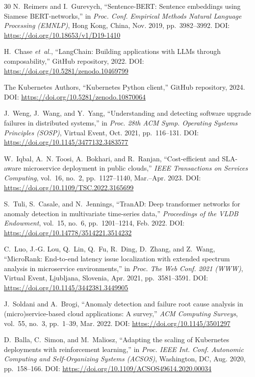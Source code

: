 \documentclass[journal,10pt,twoside]{IEEEtran}
\begin{document}
\begin{thebibliography}{30}
N.~Reimers and I.~Gurevych,
``Sentence-BERT: Sentence embeddings using Siamese BERT-networks,''
in \textit{Proc. Conf. Empirical Methods Natural Language Processing
(EMNLP)}, Hong Kong, China, Nov. 2019, pp.~3982--3992.
\newblock DOI: \url{https://doi.org/10.18653/v1/D19-1410}

H.~Chase \textit{et~al.},
``LangChain: Building applications with LLMs through composability,''
GitHub repository, 2022.
\newblock DOI: \url{https://doi.org/10.5281/zenodo.10469799}

The Kubernetes Authors,
``Kubernetes Python client,''
GitHub repository, 2024.
\newblock DOI: \url{https://doi.org/10.5281/zenodo.10870064}

J.~Weng, J.~Wang, and Y.~Yang,
``Understanding and detecting software upgrade failures in distributed systems,''
in \textit{Proc. 28th ACM Symp. Operating Systems Principles (SOSP)},
Virtual Event, Oct. 2021, pp.~116--131.
\newblock DOI: \url{https://doi.org/10.1145/3477132.3483577}

W.~Iqbal, A.~N. Toosi, A.~Bokhari, and R.~Ranjan,
``Cost-efficient and SLA-aware microservice deployment in public clouds,''
\textit{IEEE Transactions on Services Computing}, vol.~16, no.~2,
pp.~1127--1140, Mar.--Apr. 2023.
\newblock DOI: \url{https://doi.org/10.1109/TSC.2022.3165699}

S.~Tuli, S.~Casale, and N.~Jennings,
``TranAD: Deep transformer networks for anomaly detection in multivariate
time-series data,''
\textit{Proceedings of the VLDB Endowment}, vol.~15, no.~6,
pp.~1201--1214, Feb. 2022.
\newblock DOI: \url{https://doi.org/10.14778/3514221.3514232}

C.~Luo, J.-G. Lou, Q.~Lin, Q.~Fu, R.~Ding, D.~Zhang, and Z.~Wang,
``MicroRank: End-to-end latency issue localization with extended spectrum
analysis in microservice environments,''
in \textit{Proc. The Web Conf. 2021 (WWW)},
Virtual Event, Ljubljana, Slovenia, Apr. 2021, pp.~3581--3591.
\newblock DOI: \url{https://doi.org/10.1145/3442381.3449905}

J.~Soldani and A.~Brogi,
``Anomaly detection and failure root cause analysis in (micro)service-based
cloud applications: A survey,''
\textit{ACM Computing Surveys}, vol.~55, no.~3, pp.~1--39, Mar. 2022.
\newblock DOI: \url{https://doi.org/10.1145/3501297}

D.~Balla, C.~Simon, and M.~Maliosz,
``Adapting the scaling of Kubernetes deployments with reinforcement learning,''
in \textit{Proc. IEEE Int. Conf. Autonomic Computing and
Self-Organizing Systems (ACSOS)}, Washington, DC, Aug. 2020,
pp.~158--166.
\newblock DOI: \url{https://doi.org/10.1109/ACSOS49614.2020.00034}


\end{thebibliography}
\end{document}
